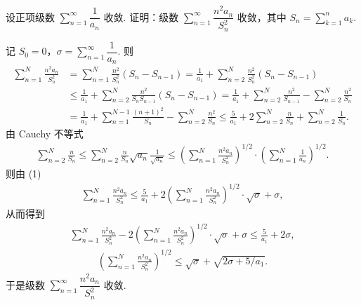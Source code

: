 设正项级数 $\sum\limits_{n=1}^{\infty}\dfrac{1}{a_n}$ 收敛. 证明：级数 $\sum\limits_{n=1}^{\infty}\dfrac{n^2a_n}{S_n^2}$ 收敛，其中 $S_n=\sum\limits_{k=1}^{n}a_k$.
\begin{solution}
记 $S_0=0$，$\sigma=\sum\limits_{n=1}^{\infty}\dfrac{1}{a_n}$. 则
\begin{align*}
\sum_{n=1}^{N}\frac{n^2a_n}{S_n^2}&=\sum_{n=1}^{N}\frac{n^2}{S_n^2}(S_n-S_{n-1})=\frac{1}{a_1}+\sum_{n=2}^{N}\frac{n^2}{S_n^2}(S_n-S_{n-1})\\
&\le\frac{1}{a_1}+\sum_{n=2}^{N}\frac{n^2}{S_nS_{n-1}}(S_n-S_{n-1})=\frac{1}{a_1}+\sum_{n=2}^{N}\frac{n^2}{S_{n-1}}-\sum_{n=2}^{N}\frac{n^2}{S_n}\\
&=\frac{1}{a_1}+\sum_{n=1}^{N-1}\frac{(n+1)^2}{S_n}-\sum_{n=2}^{N}\frac{n^2}{S_n}\le\frac{5}{a_1}+2\sum_{n=2}^{N}\frac{n}{S_n}+\sum_{n=2}^{N}\frac{1}{S_n}. \tag{1}
\end{align*}
由 Cauchy 不等式
\begin{align*}
\sum_{n=2}^{N}\frac{n}{S_n}\le\sum_{n=2}^{N}\frac{n}{S_n}\sqrt{a_n}\frac{1}{\sqrt{a_n}}\le\left(\sum_{n=1}^{N}\frac{n^2a_n}{S_n^2}\right)^{1/2}\cdot\left(\sum_{n=1}^{N}\frac{1}{a_n}\right)^{1/2}.
\end{align*}
则由 (1)
\begin{align*}
\sum_{n=1}^{N}\frac{n^2a_n}{S_n^2}\le\frac{5}{a_1}+2\left(\sum_{n=1}^{N}\frac{n^2a_n}{S_n^2}\right)^{1/2}\cdot\sqrt{\sigma}+\sigma,
\end{align*}
从而得到
\begin{align*}
\sum_{n=1}^{N}\frac{n^2a_n}{S_n^2}-2\left(\sum_{n=1}^{N}\frac{n^2a_n}{S_n^2}\right)^{1/2}\cdot\sqrt{\sigma}+\sigma\le\frac{5}{a_1}+2\sigma,
\end{align*}
\begin{align*}
\left(\sum_{n=1}^{N}\frac{n^2a_n}{S_n^2}\right)^{1/2}\le\sqrt{\sigma}+\sqrt{2\sigma+5/a_1}.
\end{align*}
于是级数 $\sum\limits_{n=1}^{\infty}\dfrac{n^2a_n}{S_n^2}$ 收敛.
\end{solution}
